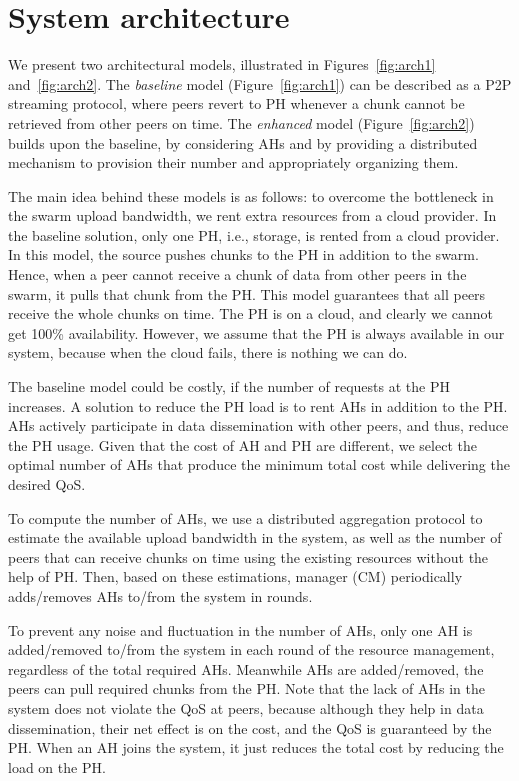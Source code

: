 \section{System architecture} \label{sec:system}
We present two architectural models, illustrated
in Figures~\ref{fig:arch1} and~\ref{fig:arch2}. The \emph{baseline} model
(Figure~\ref{fig:arch1}) can be described as a P2P streaming protocol, where
peers revert to PH whenever a chunk cannot be retrieved from other peers on time. The
\emph{enhanced} model (Figure~\ref{fig:arch2}) builds upon the baseline, by
considering AHs and by providing a distributed mechanism to provision their
number and appropriately organizing them. 

The main idea behind these models is as follows: to overcome the bottleneck in the swarm upload bandwidth, we rent extra resources from a cloud provider. In the baseline solution, only one PH, i.e., storage, is rented from a cloud provider. In this model, the source pushes chunks to the PH in addition to the swarm. Hence, when a peer cannot receive a chunk of data from other peers in the swarm, it pulls that chunk from the PH. This model guarantees that all peers receive the whole chunks on time. The PH is on a cloud, and clearly we cannot get 100\% availability. However, we assume that the PH is always available in our system, because when the cloud fails, there is nothing we can do.

The baseline model could be costly, if the number of requests at the PH increases. A solution to reduce the PH load is to rent AHs in addition to the PH. AHs actively participate in data dissemination with other peers, and thus, reduce the PH usage. Given that the cost of AH and PH are different, we select the optimal number of AHs that produce the minimum total cost while delivering the desired QoS. 

To compute the number of AHs, we use a distributed aggregation protocol to estimate the available upload bandwidth in the system, as well as the number of peers that can receive chunks on time using the existing resources without the help of PH. Then, based on these estimations, \clive manager (CM) periodically adds/removes AHs to/from the system in rounds.

To prevent any noise and fluctuation in the number of AHs, only one AH is added/removed to/from the system in each round of the resource management, regardless of the total required AHs. Meanwhile AHs are added/removed, the peers can pull required chunks from the PH. Note that the lack of AHs in the system does not violate the QoS at peers, because although they help in data dissemination, their net effect is on the cost, and the QoS is guaranteed by the PH. When an AH joins the system, it just reduces the total cost by reducing the load on the PH.

